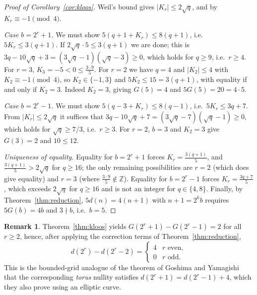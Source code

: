 \documentclass[a4paper]{article}
\theoremstyle{definition}
\newtheorem{remark}[theorem]{Remark}
\newcommand{\Z}{\mathbb{Z}}
\newcommand{\abs}[1]{\left| #1 \right|}
\begin{document}
	\begin{proof}[Proof of Corollary~\ref{cor:kloos}]
		Weil's bound gives $\abs{K_r} \leq 2\sqrt q$, and by \cite{LachaudWolfmann1990} $K_r \equiv -1 \pmod 4$.

		\emph{Case $b = 2^r + 1$.}
		We must show $5(q + 1 + K_r) \leq 8(q+1)$, i.e.\ $5K_r \leq 3(q+1)$.
		If $2\sqrt{q} \cdot 5 \leq 3(q+1)$ we are done; this is $3q - 10\sqrt q + 3 = (3\sqrt q - 1)(\sqrt q - 3) \geq 0$, which holds for $q \geq 9$, i.e.\ $r \geq 4$.
		For $r = 3$, $K_3 = -5 < 0 \le \frac{3 \cdot 9}{5}$.
		For $r = 2$ we have $q = 4$ and $\abs{K_2} \leq 4$ with $K_2 \equiv -1 \pmod 4$, so $K_2 \in \{-1, 3\}$ and $5K_2 \leq 15 = 3(q+1)$, with equality if and only if $K_2 = 3$.
		Indeed $K_2 = 3$, giving $G(5) = 4$ and $5G(5) = 20 = 4 \cdot 5$.

		\emph{Case $b = 2^r - 1$.}
		We must show $5(q - 3 + K_r) \leq 8(q-1)$, i.e.\ $5 K_r \leq 3q + 7$.
		From $\abs{K_r} \leq 2\sqrt q$ it suffices that $3q - 10\sqrt q + 7 = (3\sqrt q - 7)(\sqrt q - 1) \geq 0$, which holds for $\sqrt q \geq 7/3$, i.e.\ $r \geq 3$.
		For $r = 2$, $b = 3$ and $K_2 = 3$ give $G(3) = 2$ and $10 \le 12$.

		\emph{Uniqueness of equality.}
		Equality for $b = 2^r+1$ forces $K_r = \frac{3(q+1)}{5}$, and $\frac{3(q+1)}{5} > 2\sqrt q$ for $q \geq 16$; the only remaining possibilities are $r = 2$ (which does give equality) and $r = 3$ (where $\frac{3 \cdot 9}{5} \notin \Z$).
		Equality for $b = 2^r - 1$ forces $K_r = \frac{3q+7}{5}$, which exceeds $2\sqrt q$ for $q \ge 16$ and is not an integer for $q \in \{4, 8\}$.
		Finally, by Theorem~\ref{thm:reduction}, $5d(n) = 4(n+1)$ with $n + 1 = 2^k b$ requires $5 G(b) = 4b$ and $3 \nmid b$, i.e.\ $b = 5$.
	\end{proof}

	\begin{remark}
		Theorem~\ref{thm:kloos} yields $G(2^r+1) - G(2^r-1) = 2$ for all $r \ge 2$, hence, after applying the correction terms of Theorem~\ref{thm:reduction},
		\begin{equation*}
			d\!\left(2^r\right) - d\!\left(2^r - 2\right) =
			\begin{cases}
				4 & r \text{ even},\\
				0 & r \text{ odd}.
			\end{cases}
		\end{equation*}
		This is the bounded-grid analogue of the theorem of Goshima and Yamagishi \cite{GOSHIMAYAMAGISHI2010} that the corresponding \emph{torus} nullity satisfies $d(2^r+1) = d(2^r-1) + 4$, which they also prove using an elliptic curve.
	\end{remark}
\end{document}
